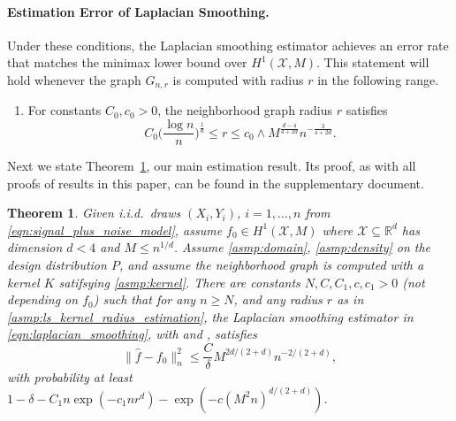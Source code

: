 \documentclass[twoside]{article}
\newcommand{\Reals}{\mathbb{R}}
\newcommand{\1}{\mathbf{1}}
\newcommand{\Rd}{\Reals^d}
\newcommand{\Xset}{\mathcal{X}}
\newcommand{\wh}[1]{\widehat{#1}}
\newtheorem{theorem}{Theorem}
\theoremstyle{definition}
\theoremstyle{remark}
\begin{document}
\paragraph{Estimation Error of Laplacian Smoothing.} 

Under these conditions, the Laplacian smoothing estimator \smash{$\wh{f}$} achieves an error rate that matches the minimax lower bound over $H^1(\Xset,M)$. This statement will hold whenever the graph $G_{n,r}$ is computed with radius $r$ in the following range.
\begin{enumerate}[label=(R\arabic*)]
	\setcounter{enumi}{0}
	\item 
	\label{asmp:ls_kernel_radius_estimation}
	For constants $C_0,c_0>0$, the neighborhood graph radius $r$ satisfies
	\begin{equation*}
    C_0 \biggl(\frac{\log n}{n}\biggr)^{\frac{1}{d}} \leq r \leq c_0 \wedge M^{\frac{d - 4}{4 + 2d}} n^{-\frac{3}{4 + 2d}}.  
	\end{equation*}
\end{enumerate}

Next we state Theorem~\ref{thm:laplacian_smoothing_estimation1}, our main estimation result. Its proof, as with all proofs of results in this paper, can be found in the supplementary document. 
\begin{theorem}
	\label{thm:laplacian_smoothing_estimation1}
  Given i.i.d.\ draws $(X_i,Y_i)$, $i=1,\ldots,n$ from \eqref{eqn:signal_plus_noise_model}, assume $f_0 \in H^1(\Xset,M)$ where $\Xset \subseteq \Rd$ has dimension $d < 4$ and $M \leq n^{1/d}$. Assume \ref{asmp:domain}, \ref{asmp:density} on the design distribution $P$, and assume the neighborhood graph  is computed with a kernel $K$ satifsying \ref{asmp:kernel}. There are constants $N,C,C_1,c,c_1>0$ (not depending on $f_0$) such that for any $n \geq N$, and any radius $r$ as in \ref{asmp:ls_kernel_radius_estimation}, the Laplacian smoothing estimator \smash{$\wh{f}$} in \eqref{eqn:laplacian_smoothing}, with  and , satisfies
	\begin{equation*}
	\bigl\|\wh{f} - f_0\bigr\|_n^2 \leq \frac{C}{\delta} M^{2d/(2 + d)} n^{-2/(2 + d)},
	\end{equation*}
  with probability at least $1 - \delta -  C_1n\exp(-c_1nr^d) - \exp(-c (M^2n)^{d/(2 + d)})$.
\end{theorem}
\end{document}
